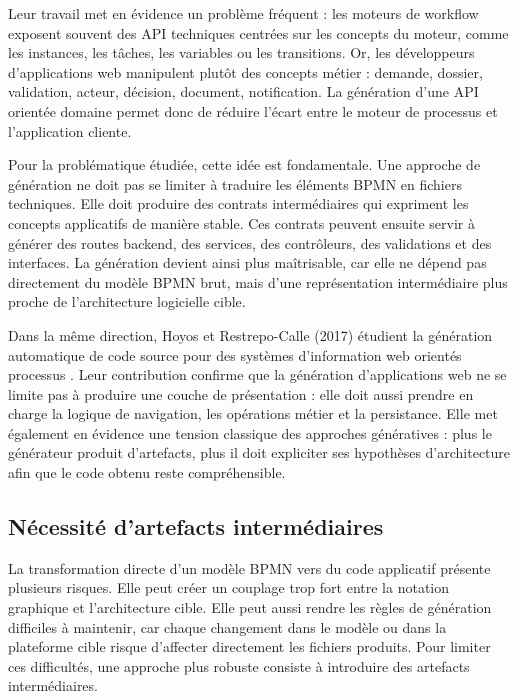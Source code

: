 Leur travail met en évidence un problème fréquent : les moteurs de workflow exposent souvent des API techniques centrées sur les concepts du moteur, comme les instances, les tâches, les variables ou les transitions. Or, les développeurs d'applications web manipulent plutôt des concepts métier : demande, dossier, validation, acteur, décision, document, notification. La génération d'une API orientée domaine permet donc de réduire l'écart entre le moteur de processus et l'application cliente.

Pour la problématique étudiée, cette idée est fondamentale. Une approche de génération ne doit pas se limiter à traduire les éléments BPMN en fichiers techniques. Elle doit produire des contrats intermédiaires qui expriment les concepts applicatifs de manière stable. Ces contrats peuvent ensuite servir à générer des routes backend, des services, des contrôleurs, des validations et des interfaces. La génération devient ainsi plus maîtrisable, car elle ne dépend pas directement du modèle BPMN brut, mais d'une représentation intermédiaire plus proche de l'architecture logicielle cible.

Dans la même direction, Hoyos et Restrepo-Calle (2017) étudient la génération automatique de code source pour des systèmes d'information web orientés processus \cite{hoyos2017}. Leur contribution confirme que la génération d'applications web ne se limite pas à produire une couche de présentation : elle doit aussi prendre en charge la logique de navigation, les opérations métier et la persistance. Elle met également en évidence une tension classique des approches génératives : plus le générateur produit d'artefacts, plus il doit expliciter ses hypothèses d'architecture afin que le code obtenu reste compréhensible.

\subsection{Nécessité d'artefacts intermédiaires}

La transformation directe d'un modèle BPMN vers du code applicatif présente plusieurs risques. Elle peut créer un couplage trop fort entre la notation graphique et l'architecture cible. Elle peut aussi rendre les règles de génération difficiles à maintenir, car chaque changement dans le modèle ou dans la plateforme cible risque d'affecter directement les fichiers produits. Pour limiter ces difficultés, une approche plus robuste consiste à introduire des artefacts intermédiaires.

